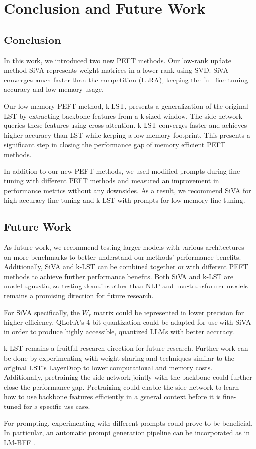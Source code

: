 \section{Conclusion and Future Work}

\subsection{Conclusion}
In this work, we introduced two new PEFT methods. Our low-rank update method SiVA represents weight matrices in a lower rank using SVD. SiVA converges much faster than the competition (LoRA), keeping the full-fine tuning accuracy and low memory usage.

Our low memory PEFT method, k-LST, presents a generalization of the original LST by extracting backbone features from a k-sized window. The side network queries these features using cross-attention. k-LST converges faster and achieves higher accuracy than LST while keeping a low memory footprint. This presents a significant step in closing the performance gap of memory efficient PEFT methods.

In addition to our new PEFT methods, we used modified prompts during fine-tuning with different PEFT methods and measured an improvement in performance metrics without any downsides. As a result, we recommend SiVA for high-accuracy fine-tuning and k-LST with prompts for low-memory fine-tuning.

\subsection{Future Work}
As future work, we recommend testing larger models with various architectures on more benchmarks to better understand our methods' performance benefits. Additionally, SiVA and k-LST can be combined together or with different PEFT methods to achieve further performance benefits. Both SiVA and k-LST are model agnostic, so testing domains other than NLP and non-transformer models remains a promising direction for future research.

For SiVA specifically, the \(W_r\) matrix could be represented in lower precision for higher efficiency. QLoRA's 4-bit quantization \cite{dettmers2023qlora} could be adapted for use with SiVA in order to produce highly accessible, quantized LLMs with better accuracy.

k-LST remains a fruitful research direction for future research. Further work can be done by experimenting with weight sharing and techniques similar to the original LST's LayerDrop to lower computational and memory costs. Additionally, pretraining the side network jointly with the backbone could further close the performance gap. Pretraining could enable the side network to learn how to use backbone features efficiently in a general context before it is fine-tuned for a specific use case.

For prompting, experimenting with different prompts could prove to be beneficial. In particular, an automatic prompt generation pipeline can be incorporated as in LM-BFF \cite{prompt}.
